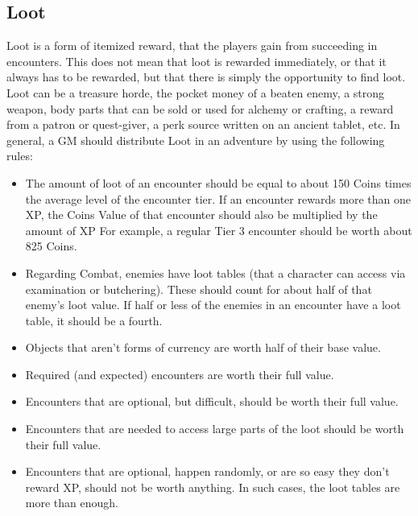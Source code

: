 \subsection{Loot}\label{subsec:loot}
Loot is a form of itemized reward, that the players gain from succeeding in encounters.
This does not mean that loot is rewarded immediately, or that it always has to be rewarded, but that there is simply the opportunity to find loot.
Loot can be a treasure horde, the pocket money of a beaten enemy, a strong weapon, body parts that can be sold or used for alchemy or crafting, a reward from a patron or quest-giver, a perk source written on an ancient tablet, etc.
In general, a GM should distribute Loot in an adventure by using the following rules:
\begin{itemize}
	\item The amount of loot of an encounter should be equal to about 150 Coins times the average level of the encounter tier.
	If an encounter rewards more than one XP, the Coins Value of that encounter should also be multiplied by the amount of XP
	For example, a regular Tier 3 encounter should be worth about 825 Coins.
	\item Regarding Combat, enemies have loot tables (that a character can access via examination or butchering).
	These should count for about half of that enemy's loot value.
	If half or less of the enemies in an encounter have a loot table, it should be a fourth.
	\item Objects that aren't forms of currency are worth half of their base value.
	\item Required (and expected) encounters are worth their full value.
	\item Encounters that are optional, but difficult, should be worth their full value.
	\item Encounters that are needed to access large parts of the loot should be worth their full value.
	\item Encounters that are optional, happen randomly, or are so easy they don't reward XP, should not be worth anything.
	In such cases, the loot tables are more than enough.
\end{itemize}






